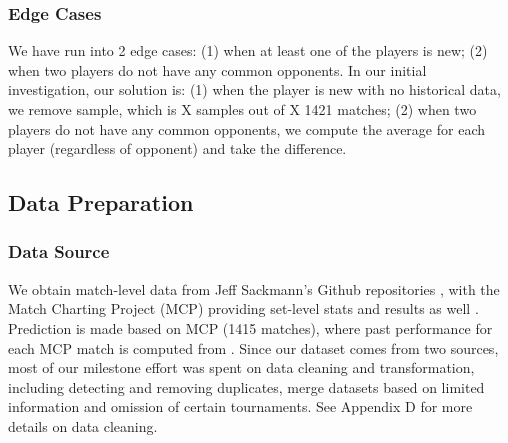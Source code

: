 \documentclass[paper=a4, fontsize=11pt]{scrartcl} %
\numberwithin{equation}{section} %
\numberwithin{figure}{section} %
\numberwithin{table}{section} %
\begin{document}
\subsubsection{Edge Cases}
We have run into 2 edge cases: (1) when at least one of the players is new; (2) when two players do not have any common opponents.  In our initial investigation, our solution is: (1) when the player is new with no historical data, we remove sample, which is X samples out of X 1421 matches; (2) when two players do not have any common opponents, we compute the average for each player (regardless of opponent) and take the difference.
\subsection{Data Preparation}
\subsubsection{Data Source}
We obtain match-level data from Jeff Sackmann's Github repositories \cite{tennis_atp} \cite{tennis_charting}, with the Match Charting Project (MCP) providing set-level stats and results as well \cite{tennis_charting}. Prediction is made based on MCP (1415 matches), where past performance for each MCP match is computed from \cite{tennis_atp}. Since our dataset comes from two sources, most of our milestone effort was spent on data cleaning and transformation, including detecting and removing duplicates, merge datasets based on limited information and omission of certain tournaments.  See Appendix D for more details on data cleaning.
\end{document}
